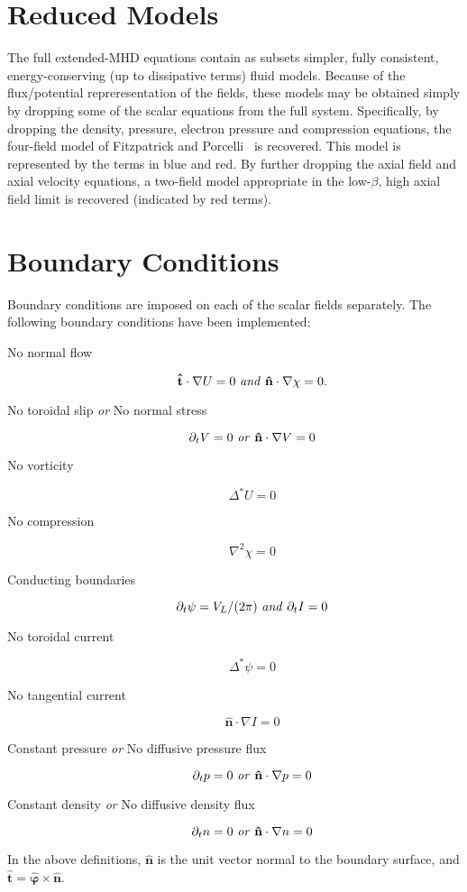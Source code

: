 \documentclass[draft]{book}
\renewcommand{\vec}[1]{\ensuremath{\mathbf{#1}}}
\newcommand{\tor}{\varphi}              %
\newcommand{\grad}[1]{\nabla #1}
\newcommand{\gs}[1]{\Delta^* #1}
\newcommand{\lp}[1]{\nabla^2 #1}
\newcommand{\uvec}[1]{\ensuremath{\vec{\hat{#1}}}}
\begin{document}
\section{Reduced Models}

The full extended-MHD equations contain as subsets simpler, fully
consistent, energy-conserving (up to dissipative terms) fluid models.
Because of the flux/po\-ten\-tial repreresentation of the fields, these
models may be obtained simply by dropping some of the scalar equations
from the full system.  Specifically, by dropping the density,
pressure, electron pressure and compression equations, the four-field
model of Fitzpatrick and Porcelli~\cite{Fitzpatrick04} is recovered.
This model is represented by the terms in blue and red.  By further
dropping the axial field and axial velocity equations, a two-field
model appropriate in the low-$\beta$, high axial field limit is
recovered (indicated by red terms).


\section{Boundary Conditions}

Boundary conditions are imposed on each of the scalar fields
separately.  The following boundary conditions have been implemented:

\begin{description}
\item[No normal flow]
  \[ \uvec{t} \cdot \grad U = 0  \mbox{ \emph{and} }
     \uvec{n} \cdot \grad\chi = 0. \]
\item[No toroidal slip \emph{or} No normal stress]
  \[ \partial_t V = 0 \mbox{ \emph{or} } \uvec{n} \cdot \grad V = 0 \]
\item[No vorticity]
  \[ \gs{U} = 0 \]
\item[No compression]
  \[ \lp{\chi} = 0 \]
\item[Conducting boundaries]
  \[ \partial_t \psi = V_L / (2 \pi) \mbox{ \emph{and} } \partial_t I = 0 \]
\item[No toroidal current]
  \[ \gs{\psi} = 0 \]
\item[No tangential current]
  \[ \uvec{n} \cdot \grad I = 0 \]
\item[Constant pressure \emph{or} No diffusive pressure flux]
  \[ \partial_t p = 0 \mbox{ \emph{or} } \uvec{n} \cdot \grad p = 0 \]
\item[Constant density \emph{or} No diffusive density flux]
  \[ \partial_t n = 0 \mbox{ \emph{or} } \uvec{n} \cdot \grad n = 0 \]
\end{description}
In the above definitions, $\uvec{n}$ is the unit vector normal to the
boundary surface, and $\uvec{t} = \uvec{\tor} \times \uvec{n}$.
\end{document}
